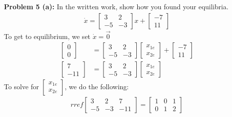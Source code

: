\documentclass[12pt]{article}
\begin{document}
\noindent \textbf{Problem 5 (a): }In the written work, show how you found your equilibria.
	\begin{align*}
		\dot{x} = 
		\begin{bmatrix} 3 & 2 \\ -5 & -3 \end{bmatrix}x + 
		\begin{bmatrix} -7 \\ 11 \end{bmatrix}
	\end{align*}
To get to equilibrium, we set $\dot{x} = \vec{0}$
	\begin{align*}
		\begin{bmatrix} 0 \\ 0 \end{bmatrix} &= 
		\begin{bmatrix} 3 & 2 \\ -5 & -3 \end{bmatrix}
		\begin{bmatrix} x_{1e} \\ x_{2e}\end{bmatrix} + 
		\begin{bmatrix} -7 \\ 11 \end{bmatrix} \\
		\begin{bmatrix} 7 \\ -11 \end{bmatrix} &= 
		\begin{bmatrix} 3 & 2 \\ -5 & -3 \end{bmatrix}
		\begin{bmatrix} x_{1e} \\ x_{2e}\end{bmatrix}
	\end{align*}
To solve for $\begin{bmatrix} x_{1e} \\ x_{2e}\end{bmatrix}$, we do the following:
	\begin{align*}
		rref 
		\begin{bmatrix}
			3 & 2 & 7 \\
			-5 & -3 & -11
		\end{bmatrix} = 
		\begin{bmatrix}
			1 & 0 & 1 \\
			0 & 1 & 2
		\end{bmatrix}
	\end{align*} 
\end{document}
